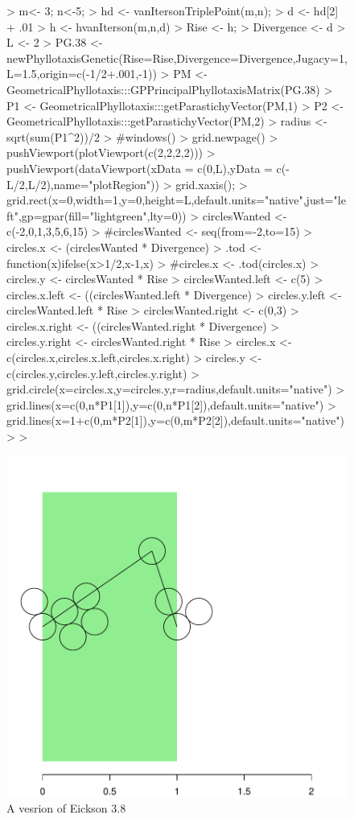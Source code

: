 \documentclass[a4paper]{article}
\begin{document}
\begin{center}
\begin{figure}[H]
\begin{Schunk}
\begin{Sinput}
> m<- 3; n<-5;
> hd <- vanItersonTriplePoint(m,n);
> d <- hd[2] + .01
> h <- hvanIterson(m,n,d)
> Rise <- h;
> Divergence <- d
> L <- 2
> PG.38 <-  newPhyllotaxisGenetic(Rise=Rise,Divergence=Divergence,Jugacy=1,L=1.5,origin=c(-1/2+.001,-1))
> PM <- GeometricalPhyllotaxis:::GPPrincipalPhyllotaxisMatrix(PG.38)
> P1 <- GeometricalPhyllotaxis:::getParastichyVector(PM,1)
> P2 <- GeometricalPhyllotaxis:::getParastichyVector(PM,2)
> radius <- sqrt(sum(P1^2))/2
> #windows()
> grid.newpage()
> pushViewport(plotViewport(c(2,2,2,2)))
> pushViewport(dataViewport(xData = c(0,L),yData = c(-L/2,L/2),name="plotRegion"))
> grid.xaxis();
> grid.rect(x=0,width=1,y=0,height=L,default.units="native",just="left",gp=gpar(fill="lightgreen",lty=0))
> circlesWanted <- c(-2,0,1,3,5,6,15)
> #circlesWanted <- seq(from=-2,to=15)
> circles.x <- (circlesWanted * Divergence) %
> .tod <- function(x){ifelse(x>1/2,x-1,x)}
> #circles.x <- .tod(circles.x)
> circles.y <- circlesWanted * Rise
> circlesWanted.left <- c(5)
> circles.x.left <-  ((circlesWanted.left * Divergence) %
> circles.y.left <-  circlesWanted.left * Rise
> circlesWanted.right <- c(0,3)
> circles.x.right <-  ((circlesWanted.right * Divergence) %
> circles.y.right <-  circlesWanted.right * Rise
> circles.x <- c(circles.x,circles.x.left,circles.x.right)
> circles.y <- c(circles.y,circles.y.left,circles.y.right)
> grid.circle(x=circles.x,y=circles.y,r=radius,default.units="native")
> grid.lines(x=c(0,n*P1[1]),y=c(0,n*P1[2]),default.units="native")
> grid.lines(x=1+c(0,m*P2[1]),y=c(0,m*P2[2]),default.units="native")
> 
> 
\end{Sinput}
\end{Schunk}
\includegraphics{figdir/cp-plotPGxt2}
\caption{A vesrion of Eickson 3.8}
\end{figure}
\end{center}







%
\end{document}
